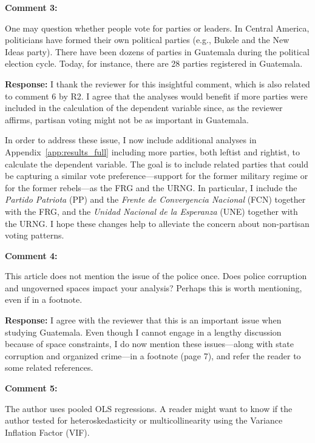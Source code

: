 \documentclass[12pt, a4paper, notitlepage]{article}
\begin{document}
\vspace{15pt}
\noindent\textbf{Comment 3:}
\begin{displayquote}
One may question whether people vote for parties or leaders. In Central America, politicians have formed their own political parties (e.g., Bukele and the New Ideas party). There have been dozens of parties in Guatemala during the political election cycle. Today, for instance, there are 28 parties registered in Guatemala.
\end{displayquote}

\noindent\textbf{Response:} I thank the reviewer for this insightful comment, which is also related to comment 6 by R2. I agree that the analyses would benefit if more parties were included in the calculation of the dependent variable since, as the reviewer affirms, partisan voting might not be as important in Guatemala.

In order to address these issue, I now include additional analyses in Appendix~\ref{app:results_full} including more parties, both leftist and rightist, to calculate the dependent variable.
The goal is to include related parties that could be capturing a similar vote preference---support for the former military regime or for the former rebels---as the FRG and the URNG.
In particular, I include the \textit{Partido Patriota} (PP) and the \textit{Frente de Convergencia Nacional} (FCN) together with the FRG, and the \textit{Unidad Nacional de la Esperanza} (UNE) together with the URNG.
I hope these changes help to alleviate the concern about non-partisan voting patterns.

\vspace{15pt}
\noindent\textbf{Comment 4:}
\begin{displayquote}
This article does not mention the issue of the police once. Does police corruption and ungoverned spaces impact your analysis? Perhaps this is worth mentioning, even if in a footnote.
\end{displayquote}

\noindent\textbf{Response:} I agree with the reviewer that this is an important issue when studying Guatemala. Even though I cannot engage in a lengthy discussion because of space constraints, I do now mention these issues---along with state corruption and organized crime---in a footnote (page 7), and refer the reader to some related references.

\vspace{15pt}
\noindent\textbf{Comment 5:}
\begin{displayquote}
The author uses pooled OLS regressions. A reader might want to know if the author tested for heteroskedasticity or multicollinearity using the Variance Inflation Factor (VIF).
\end{displayquote}
\end{document}
